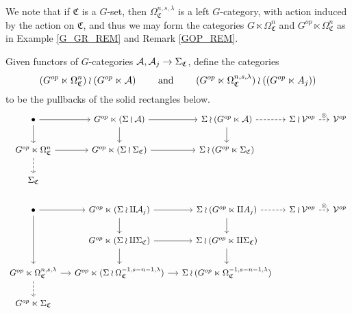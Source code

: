 \documentclass[a4paper,10pt
,draft
]{article}%
\renewcommand{\1}{\eta}%
\newcommand{\SC}{\Sigma_{\mathfrak C}}
\newcommand{\OC}{\Omega_{\mathfrak C}}
\begin{document}
\begin{remark}
      We note that if $\mathfrak C$ is a $G$-set, then
      $\OC^{n,s,\lambda}$ is a left $G$-category, with action induced by the action on $\mathfrak C$,
      and thus we may form the categories $G \ltimes \OC^n$ and $G^{op} \ltimes \OC^n$ as in Example \ref{G_GR_REM} and Remark \ref{GOP_REM}.
\end{remark}

\begin{definition}
      \label{NA_DEF}
      Given functors of $G$-categories $\mathcal{A}, \mathcal{A}_j \to \Sigma_{\mathfrak C}$, define the categories
      \begin{equation}
            (G^{op} \ltimes \Omega_{\mathfrak C}^{n}) \wr (G^{op} \ltimes \mathcal{A})
            \qquad \mbox{ and } \qquad
            (G^{op} \ltimes \Omega_{\mathfrak C}^{n,s,\lambda}) \wr ((G^{op} \ltimes A_j))
      \end{equation}
      to be the pullbacks of the solid rectangles below.
      \begin{equation}
            \label{LSTRINGS_EQ}
            \begin{tikzcd}[column sep = small]
                  \bullet \arrow[d] \arrow[r]
                  &
                  G^{op} \ltimes (\Sigma \wr \A) \arrow[d] \arrow[r]
                  &
                  \Sigma \wr (G^{op} \ltimes \A) \arrow[d] \arrow[r, dashed]
                  &
                  \Sigma \wr \V^{op} \arrow[r, dashed, "\otimes"]
                  &
                  \V^{op}
                  \\
                  G^{op} \ltimes \Omega_{\mathfrak C}^{n} \arrow[r] \arrow[d, dashed]
                  &
                  G^{op} \ltimes (\Sigma \wr \Sigma_{\mathfrak C}) \arrow[r]
                  &
                  \Sigma \wr (G^{op} \ltimes \Sigma_{\mathfrak C})
                  \\
                  \SC
                  \\ %
                  \bullet \arrow[dd] \arrow[r]
                  &
                  G^{op} \ltimes (\Sigma \wr \amalg \A_j) \arrow[d] \arrow[r]
                  &
                  \Sigma \wr (G^{op} \ltimes \amalg A_j) \arrow[d] \arrow[r, dashed]
                  &
                  \Sigma \wr \V^{op} \arrow[r, dashed, "\otimes"]
                  &
                  \V^{op}
                  \\
                  &
                  G^{op} \ltimes (\Sigma \wr \amalg \SC) \arrow[d] \arrow[r]
                  &
                  \Sigma \wr (G^{op} \ltimes \amalg \SC) \arrow[d]
                  \\
                  G^{op} \ltimes \OC^{n,s,\lambda} \arrow[r] \arrow[d, dashed]
                  &
                  G^{op} \ltimes (\Sigma \wr \OC^{-1,s-n-1,\lambda}) \arrow[r]
                  &
                  \Sigma \wr (G^{op} \ltimes \OC^{-1,s-n-1,\lambda})
                  \\
                  G^{op} \ltimes \SC
            \end{tikzcd}
      \end{equation}


\end{definition}
\end{document}
